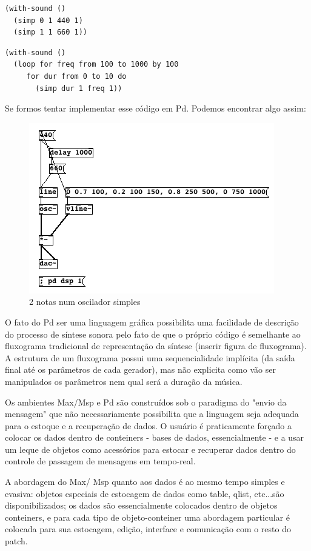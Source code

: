 \documentclass[12pt]{article}
\begin{document}
\begin{verbatim}
(with-sound ()
  (simp 0 1 440 1)
  (simp 1 1 660 1))
\end{verbatim}

\begin{verbatim}
(with-sound ()
  (loop for freq from 100 to 1000 by 100
     for dur from 0 to 10 do
       (simp dur 1 freq 1))
\end{verbatim}

Se formos tentar implementar esse código em Pd. Podemos encontrar algo assim: 

\begin{figure}[hp]
  \centering
  \includegraphics[scale=.5]{exemplopd1}
  \caption{2 notas num oscilador simples}
  \label{fig:exemplopd1}
\end{figure}

O fato do Pd ser uma linguagem gráfica possibilita uma facilidade de
descrição do processo de síntese sonora pelo fato de que o próprio
código é semelhante ao fluxograma tradicional de representação da
síntese (inserir figura de fluxograma). A estrutura de um fluxograma
possui uma sequencialidade implícita (da saída final até os parâmetros
de cada gerador), mas não explicita como vão ser manipulados os
parâmetros nem qual será a duração da música.

Os ambientes Max/Msp e Pd são construídos sob o paradigma do 
"envio da mensagem" que não necessariamente possibilita que a 
linguagem seja adequada para o estoque e a recuperação de dados. 
O usuário é praticamente forçado a colocar os dados dentro de conteiners - 
bases de dados, essencialmente - e a usar um leque de objetos como 
acessórios para estocar e recuperar dados dentro do controle de passagem 
de mensagens em tempo-real.

A abordagem do Max/ Msp quanto aos dados é ao mesmo tempo simples e
evasiva: objetos especiais de estocagem de dados como table, qlist,
etc...são disponibilizados; os dados são essencialmente
colocados dentro de objetos conteiners, e para cada tipo de
objeto-conteiner uma abordagem  particular é colocada para
sua estocagem, edição, interface e comunicação com o resto do patch.
\end{document}
